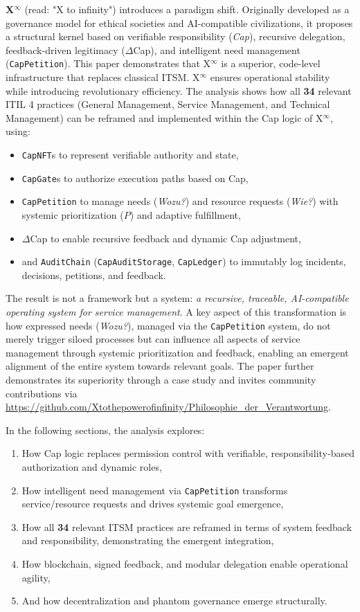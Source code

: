 \documentclass[12pt, a4paper]{scrartcl}
\newcommand{\Xinf}{X$^\infty$}                        %
\newcommand{\DeltaCap}{$\Delta$Cap}                    %
\newcommand{\CapLedger}{\texttt{CapLedger}}          %
\newcommand{\CapNFT}{\texttt{CapNFT}}
\newcommand{\CapGate}{\texttt{CapGate}}
\newcommand{\AuditChain}{\texttt{AuditChain}}
\newcommand{\CapPetition}{\texttt{CapPetition}}        %
\newcommand{\Wozu}{\textit{Wozu?}}                      %
\newcommand{\Wie}{\textit{Wie?}}                        %
\begin{document}
\textbf{\Xinf{}} (read: "X to infinity") introduces a paradigm shift. Originally developed as a governance model for ethical societies and AI-compatible civilizations, it proposes a structural kernel based on verifiable responsibility (\textit{Cap}), recursive delegation, feedback-driven legitimacy (\DeltaCap{}), and intelligent need management (\CapPetition{}). This paper demonstrates that \Xinf{} is a superior, code-level infrastructure that replaces classical ITSM. \Xinf{} ensures operational stability while introducing revolutionary efficiency. The analysis shows how all \textbf{34} relevant ITIL 4 practices (General Management, Service Management, and Technical Management) can be reframed and implemented within the Cap logic of \Xinf{}, using:
\begin{itemize}
  \item \CapNFT{}s to represent verifiable authority and state,
  \item \CapGate{}s to authorize execution paths based on Cap,
  \item \CapPetition{} to manage needs (\Wozu{}) and resource requests (\Wie{}) with systemic prioritization ($P$) and adaptive fulfillment,
  \item \DeltaCap{} to enable recursive feedback and dynamic Cap adjustment,
  \item and \AuditChain{} (\texttt{CapAuditStorage}, \CapLedger{}) to immutably log incidents, decisions, petitions, and feedback.
\end{itemize}
The result is not a framework but a system: \textit{a recursive, traceable, AI-compatible operating system for service management}. A key aspect of this transformation is how expressed needs (\Wozu{}), managed via the \CapPetition{} system, do not merely trigger siloed processes but can influence all aspects of service management through systemic prioritization and feedback, enabling an emergent alignment of the entire system towards relevant goals. The paper further demonstrates its superiority through a case study and invites community contributions via \url{https://github.com/Xtothepowerofinfinity/Philosophie_der_Verantwortung}.

In the following sections, the analysis explores:
\begin{enumerate}
    \item How Cap logic replaces permission control with verifiable, responsibility-based authorization and dynamic roles, %
    \item How intelligent need management via \CapPetition{} transforms service/resource requests and drives systemic goal emergence, %
    \item How all \textbf{34} relevant ITSM practices are reframed in terms of system feedback and responsibility, demonstrating the emergent integration,
    \item How blockchain, signed feedback, and modular delegation enable operational agility,
    \item And how decentralization and phantom governance emerge structurally.
\end{enumerate}
\end{document}
